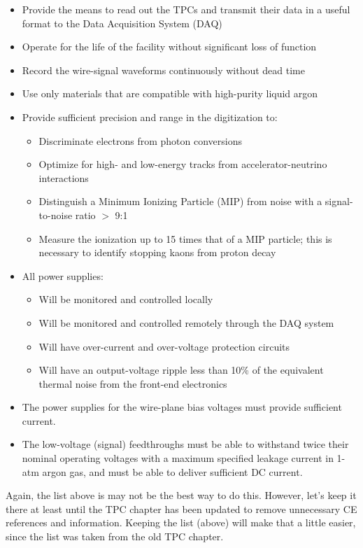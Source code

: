 \begin{itemize}	
\item Provide the means to read out the TPCs and transmit their data in a useful format to the Data Acquisition System (DAQ)
\item Operate for the life of the facility without significant loss of function
\item Record the wire-signal waveforms continuously without dead time
\item Use only materials that are compatible with high-purity liquid argon
\item Provide sufficient precision and range in the digitization to:
\begin{itemize}
\item Discriminate electrons from photon conversions
\item Optimize for high- and low-energy tracks from accelerator-neutrino interactions
\item Distinguish a Minimum Ionizing Particle (MIP) from noise with a signal-to-noise ratio $>$ 9:1
\item Measure the ionization up to 15 times that of a MIP particle;
this is necessary to identify stopping kaons from proton decay
\end{itemize}
\item All power supplies:
\begin{itemize}
\item Will be monitored and controlled locally
\item Will be monitored and controlled remotely through the DAQ system
\item Will have over-current and over-voltage protection circuits
\item Will have an output-voltage ripple less than 10\% of the equivalent thermal noise from the front-end electronics
\end{itemize}
\item The power supplies for the wire-plane bias voltages must provide sufficient current.
\item The low-voltage (signal) feedthroughs must be able to withstand twice their nominal operating voltages 
with a maximum specified leakage current in 1-atm argon gas, and must be able to deliver sufficient DC current.
\end{itemize}

\begin{editornote}
  Again, the list above is may not be the best way to do this.
  However, let's keep it there at least until the TPC chapter has been
  updated to remove unnecessary CE references and information.
  Keeping the list (above) will make that a little easier, since the list was taken from the old TPC chapter.
\end{editornote}

